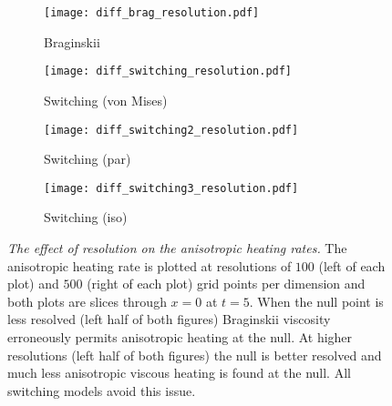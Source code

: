 \begin{figure}[t]
    \hfill
    \begin{subfigure}{0.49\textwidth}
      \centering
      \texttt{[image: diff\_brag\_resolution.pdf]}
      \caption{Braginskii}%
      \label{fig:diff_brag_resolution}
    \end{subfigure}
    \hfill
    \begin{subfigure}{0.49\textwidth}
      \texttt{[image: diff\_switching\_resolution.pdf]}
      \caption{Switching (von Mises)}%
      \label{fig:diff_switching_resolution}
    \end{subfigure}
    \hfill
    \begin{subfigure}{0.49\textwidth}
      \texttt{[image: diff\_switching2\_resolution.pdf]}
      \caption{Switching (par)}%
      \label{fig:diff_switching2_resolution}
    \end{subfigure}
    \hfill
    \begin{subfigure}{0.49\textwidth}
      \texttt{[image: diff\_switching3\_resolution.pdf]}
      \caption{Switching (iso)}%
      \label{fig:diff_switching3_resolution}
    \end{subfigure}

    \caption{\emph{The effect of resolution on the anisotropic heating rates.} The anisotropic heating rate is plotted at resolutions of $100$ (left of each plot) and $500$ (right of each plot) grid points per dimension and both plots are slices through $x=0$ at $t=5$. When the null point is less resolved (left half of both figures) Braginskii viscosity erroneously permits anisotropic heating at the null. At higher resolutions (left half of both figures) the null is better resolved and much less anisotropic viscous heating is found at the null. All switching models avoid this issue.}
\label{fig:anisotropy_bleeding}%
\end{figure}
